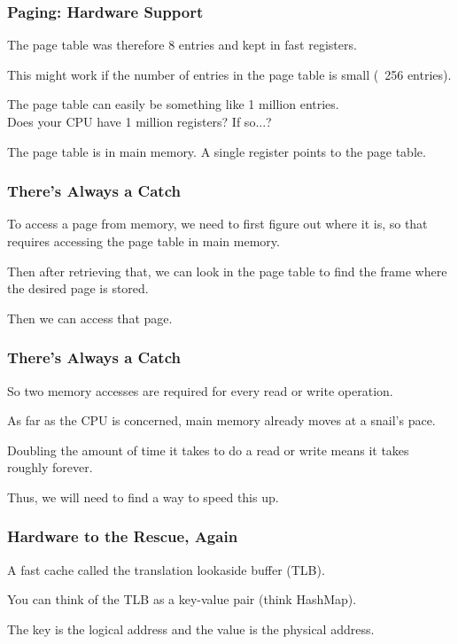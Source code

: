 \begin{frame}
\frametitle{Paging: Hardware Support}

The page table was therefore 8 entries and kept in fast registers. 

This might work if the number of entries in the page table is small (~256 entries). 

The page table can easily be something like 1 million entries.\\
\quad Does your CPU have 1 million registers? If so...?

The page table is in main memory. A single register points to the page table.


\end{frame}

\begin{frame}
\frametitle{There's Always a Catch}

To access a page from memory, we need to first figure out where it is, so that requires accessing the page table in main memory. 

Then after retrieving that, we can look in the page table to find the frame where the desired page is stored. 

Then we can access that page. 

\end{frame}

\begin{frame}
\frametitle{There's Always a Catch}

So two memory accesses are required for every read or write operation. 

As far as the CPU is concerned, main memory already moves at a snail's pace. 

Doubling the amount of time it takes to do a read or write means it takes roughly forever. 

Thus, we will need to find a way to speed this up.

\end{frame}

\begin{frame}
\frametitle{Hardware to the Rescue, Again}

A fast cache called the \alert{translation lookaside buffer} (TLB). 

You can think of the TLB as a key-value pair (think HashMap). 

The key is the logical address and the value is the physical address. 

\end{frame}

